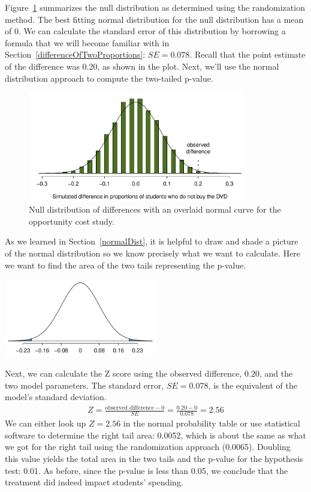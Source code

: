 Figure~\ref{OpportunityCostDiffs_w_normal} summarizes the null distribution as determined using the randomization method. The best fitting normal distribution for the null distribution has a mean of 0. We can calculate the standard error of this distribution by borrowing a formula that we will become familiar with in Section~\ref{differenceOfTwoProportions}: $SE = 0.078$. Recall that the point estimate of the difference was 0.20, as shown in the plot. Next, we'll use the normal distribution approach to compute the two-tailed p-value.

\begin{figure}
\centering
\includegraphics[width=0.85\textwidth]{02/figures/OpportunityCost/OpportunityCostDiffs_w_normal}
\caption{Null distribution of differences with an overlaid normal curve for the opportunity cost study.}
\label{OpportunityCostDiffs_w_normal}
\end{figure}

As we learned in Section~\ref{normalDist}, it is helpful to draw and shade a picture of the normal distribution so we know precisely what we want to calculate. Here we want to find the area of the two tails representing the p-value.
\begin{center}
\includegraphics[width=0.5\textwidth]{02/figures/OpportunityCost/OpportunityCostDiffs_normal_only}
\end{center}
Next, we can calculate the Z score using the observed difference, 0.20, and the two model parameters. The standard error, $SE = 0.078$, is the equivalent of the model's standard deviation.
\begin{align*}
Z = \frac{\text{observed difference} - 0}{SE} = \frac{0.20 - 0}{0.078} = 2.56
\end{align*}
We can either look up $Z = 2.56$ in the normal probability table or use statistical software to determine the right tail area: 0.0052, which is about the same as what we got for the right tail using the randomization approach (0.0065). Doubling this value yields the total area in the two tails and the p-value for the hypothesis test: 0.01. As before, since the p-value is less than 0.05, we conclude that the treatment did indeed impact students' spending.

